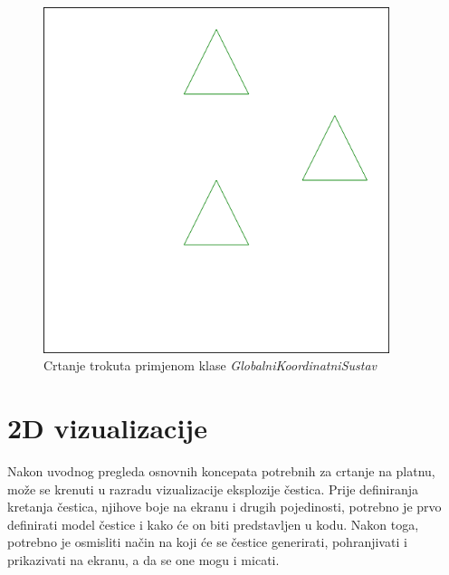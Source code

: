 \documentclass{foi}
\begin{document}
\begin{figure}[H]
    \centering
    \includegraphics[width=0.9\textwidth]{slike/8_TransformiraniTrokutiCanvas.png}
    \captionsetup{justification=centering}
    \caption{Crtanje trokuta primjenom klase \textit{GlobalniKoordinatniSustav}}
\label{fig:TransformiraniTrokutiCanvas}
\end{figure}

\chapter{2D vizualizacije}
Nakon uvodnog pregleda osnovnih koncepata potrebnih za crtanje na platnu, može se krenuti u razradu vizualizacije eksplozije čestica. Prije definiranja kretanja čestica, njihove boje na ekranu i drugih pojedinosti, potrebno je prvo definirati model čestice i kako će on biti predstavljen u kodu. Nakon toga, potrebno je osmisliti način na koji će se čestice generirati, pohranjivati i prikazivati na ekranu, a da se one mogu i micati. 
\end{document}
